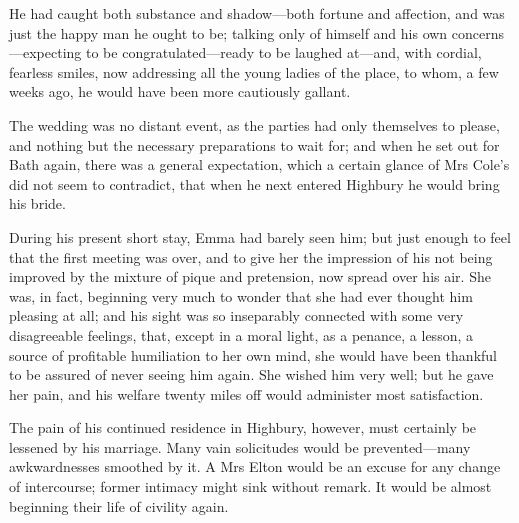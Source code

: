 He had caught both substance and shadow—both fortune and affection, and was just the happy man he ought to be; talking only of himself and his own concerns—expecting to be congratulated—ready to be laughed at—and, with cordial, fearless smiles, now addressing all the young ladies of the place, to whom, a few weeks ago, he would have been more cautiously gallant.

The wedding was no distant event, as the parties had only themselves to please, and nothing but the necessary preparations to wait for; and when he set out for Bath again, there was a general expectation, which a certain glance of Mrs Cole's did not seem to contradict, that when he next entered Highbury he would bring his bride.

During his present short stay, Emma had barely seen him; but just enough to feel that the first meeting was over, and to give her the impression of his not being improved by the mixture of pique and pretension, now spread over his air. She was, in fact, beginning very much to wonder that she had ever thought him pleasing at all; and his sight was so inseparably connected with some very disagreeable feelings, that, except in a moral light, as a penance, a lesson, a source of profitable humiliation to her own mind, she would have been thankful to be assured of never seeing him again. She wished him very well; but he gave her pain, and his welfare twenty miles off would administer most satisfaction.

The pain of his continued residence in Highbury, however, must certainly be lessened by his marriage. Many vain solicitudes would be prevented—many awkwardnesses smoothed by it. A Mrs Elton would be an excuse for any change of intercourse; former intimacy might sink without remark. It would be almost beginning their life of civility again.

